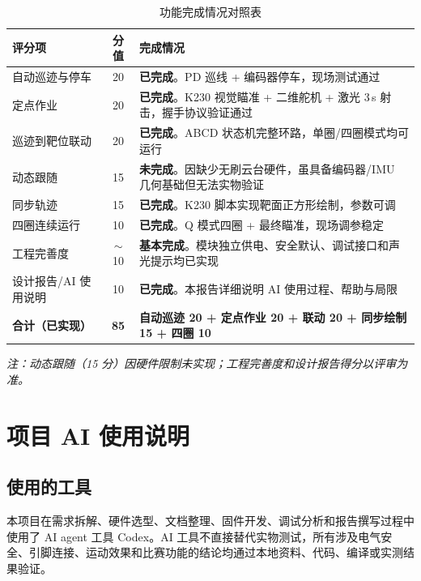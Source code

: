 \documentclass[12pt,a4paper]{ctexart}
\begin{document}
\begin{table}[H]
\centering
\caption{功能完成情况对照表}
\begin{tabular}{@{}p{3cm}cp{5.5cm}@{}}
\toprule
\textbf{评分项} & \textbf{分值} & \textbf{完成情况} \\
\midrule
自动巡迹与停车 & 20 & \textbf{已完成}。PD 巡线 + 编码器停车，现场测试通过 \\
定点作业 & 20 & \textbf{已完成}。K230 视觉瞄准 + 二维舵机 + 激光 3\,s 射击，握手协议验证通过 \\
巡迹到靶位联动 & 20 & \textbf{已完成}。ABCD 状态机完整环路，单圈/四圈模式均可运行 \\
\rowcolor{gray!15}
动态跟随 & 15 & \textbf{未完成}。因缺少无刷云台硬件，虽具备编码器/IMU 几何基础但无法实物验证 \\
同步轨迹 & 15 & \textbf{已完成}。K230 脚本实现靶面正方形绘制，参数可调 \\
四圈连续运行 & 10 & \textbf{已完成}。Q 模式四圈 + 最终瞄准，现场调参稳定 \\
工程完善度 & $\sim$10 & \textbf{基本完成}。模块独立供电、安全默认、调试接口和声光提示均已实现 \\
设计报告/AI 使用说明 & 10 & \textbf{已完成}。本报告详细说明 AI 使用过程、帮助与局限 \\
\midrule
\textbf{合计（已实现）} & \textbf{85} & \textbf{自动巡迹 20 + 定点作业 20 + 联动 20 + 同步绘制 15 + 四圈 10} \\
\bottomrule
\end{tabular}
\end{table}

\noindent\textit{注：动态跟随（15 分）因硬件限制未实现；工程完善度和设计报告得分以评审为准。}

\section{项目 AI 使用说明}

\subsection{使用的工具}
本项目在需求拆解、硬件选型、文档整理、固件开发、调试分析和报告撰写过程中使用了 AI agent 工具 Codex。AI 工具不直接替代实物测试，所有涉及电气安全、引脚连接、运动效果和比赛功能的结论均通过本地资料、代码、编译或实测结果验证。
\end{document}
